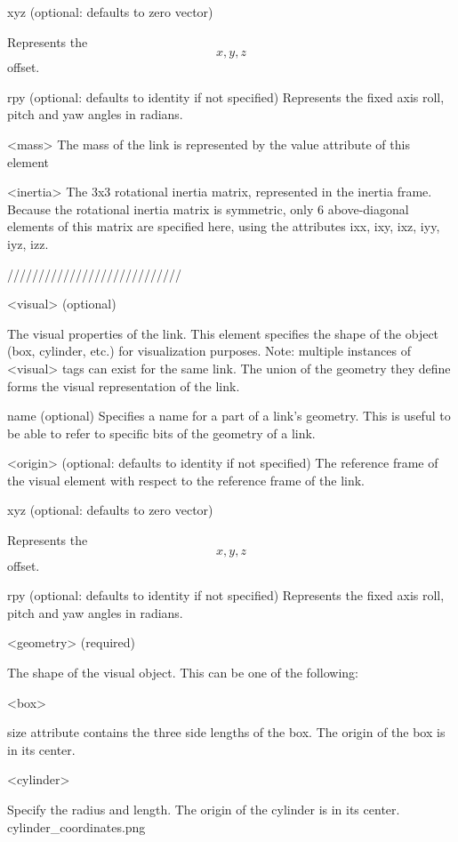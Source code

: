         xyz (optional: defaults to zero vector)

            Represents the $$x,y,z$$ offset. 

        rpy (optional: defaults to identity if not specified)
            Represents the fixed axis roll, pitch and yaw angles in radians. 

    <mass>
        The mass of the link is represented by the value attribute of this element 

    <inertia>
        The 3x3 rotational inertia matrix, represented in the inertia frame. Because the rotational inertia matrix is symmetric, only 6 above-diagonal elements of this matrix are specified here, using the attributes ixx, ixy, ixz, iyy, iyz, izz.  
        
////////////////////////////

<visual> (optional)

    The visual properties of the link. This element specifies the shape of the object (box, cylinder, etc.) for visualization purposes. Note: multiple instances of <visual> tags can exist for the same link. The union of the geometry they define forms the visual representation of the link.

    name (optional)
        Specifies a name for a part of a link's geometry. This is useful to be able to refer to specific bits of the geometry of a link. 

    <origin> (optional: defaults to identity if not specified)
        The reference frame of the visual element with respect to the reference frame of the link.

        xyz (optional: defaults to zero vector)

            Represents the $$x,y,z$$ offset. 

        rpy (optional: defaults to identity if not specified)
            Represents the fixed axis roll, pitch and yaw angles in radians. 

    <geometry> (required)

        The shape of the visual object. This can be one of the following:

        <box>

            size attribute contains the three side lengths of the box. The origin of the box is in its center. 

        <cylinder>

            Specify the radius and length. The origin of the cylinder is in its center. cylinder_coordinates.png 

